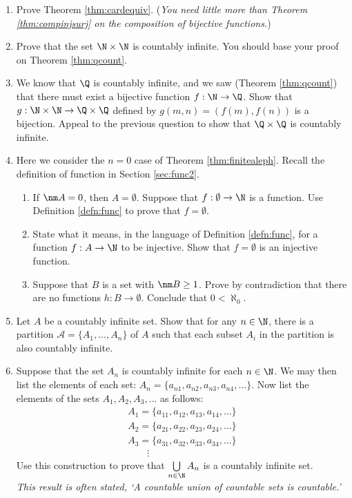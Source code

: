 \begin{enumerate}
	\item Prove Theorem \ref{thm:cardequiv}. (\emph{You need little more than Theorem \ref{thm:compinjsurj} on the composition of bijective functions.})

	\item Prove that the set $\N\times\N$ is countably infinite. You should base your proof on Theorem \ref{thm:qcount}.

	\item We know that $\Q$ is countably infinite, and we saw (Theorem \ref{thm:qcount}) that there must exist a bijective function $f:\N\to\Q$. Show that $g:\N\times\N\to\Q\times\Q$ defined by $g(m,n)=(f(m),f(n))$ is a bijection. Appeal to the previous question to show that $\Q\times\Q$ is countably infinite.
	
	\item Here we consider the $n=0$ case of Theorem \ref{thm:finitealeph}. Recall the definition of function in Section \ref{sec:func2}.
  \begin{enumerate}
    \item If $\nm A=0$, then $A=\emptyset$. Suppose that $f:\emptyset\to\N$ is a function. Use Definition \ref{defn:func} to prove that $f=\emptyset$.
    \item State what it means, in the language of Definition \ref{defn:func}, for a function $f:A\to\N$ to be injective. Show that $f=\emptyset$ is an injective function.
    \item Suppose that $B$ is a set with $\nm B\ge 1$. Prove by contradiction that there are no functions $h:B\to\emptyset$. Conclude that $0<\aleph_0$.
  \end{enumerate}
  
  \item Let $A$ be a countably infinite set. Show that for any $n \in \N$, there is a partition $\mathcal{A} = \{A_1,\ldots,A_n\}$ of $A$ such that each subset $A_i$ in the partition is also countably infinite.

	\item\label{ex:cardunion} Suppose that the set $A_n$ is countably infinite for each $n\in\N$. We may then list the elements of each set: $A_n=\{a_{n1},a_{n2},a_{n3},a_{n4},\ldots\}$. Now list the elements of the sets $A_1,A_2,A_3,\ldots$ as follows:
	\begin{gather*}
		A_1=\{a_{11},a_{12},a_{13},a_{14},\ldots\}\\
		A_2=\{a_{21},a_{22},a_{23},a_{24},\ldots\}\\
		A_3=\{a_{31},a_{32},a_{33},a_{34},\ldots\}\\
		\qquad\vdots
	\end{gather*}
	Use this construction to prove that $\bigcup\limits_{n\in\N}A_n$ is a countably infinite set.\\
	\emph{This result is often stated, `A countable union of countable sets is countable.'}
	

\end{enumerate}
